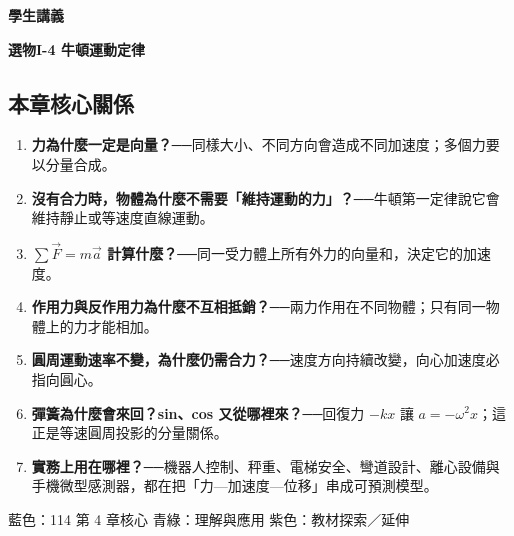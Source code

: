 \documentclass[11pt,a4paper]{article}
\providecommand{\tightlist}{%
  \setlength{\itemsep}{0pt}\setlength{\parskip}{0pt}}
\begin{document}
\begin{tcolorbox}[
  enhanced,colback=white,colframe=HandoutBlue,boxrule=1.1pt,arc=2mm,
  borderline west={3pt}{0pt}{HandoutBlue},left=5mm,right=4mm,top=4mm,bottom=4mm
]
{\sffamily\small\bfseries\color{HandoutBlue}學生講義}\par
{\sffamily\bfseries\LARGE\color{HandoutInk}選物I-4 牛頓運動定律}\par
\vspace{0.35em}{\large 從運動描述連結受力、圓周與振盪}\par
{}\par
{}\par
\end{tcolorbox}


\begin{HandoutLearningMap}

\subsection{本章核心關係}\label{ux672cux7ae0ux6838ux5fc3ux95dcux4fc2}

\begin{enumerate}
\def\labelenumi{\arabic{enumi}.}
\tightlist
\item
  \textbf{力為什麼一定是向量？}──同樣大小、不同方向會造成不同加速度；多個力要以分量合成。
\item
  \textbf{沒有合力時，物體為什麼不需要「維持運動的力」？}──牛頓第一定律說它會維持靜止或等速度直線運動。
\item
  \textbf{\(\sum\vec F=m\vec a\) 計算什麼？}──同一受力體上所有外力的向量和，決定它的加速度。
\item
  \textbf{作用力與反作用力為什麼不互相抵銷？}──兩力作用在不同物體；只有同一物體上的力才能相加。
\item
  \textbf{圓周運動速率不變，為什麼仍需合力？}──速度方向持續改變，向心加速度必指向圓心。
\item
  \textbf{彈簧為什麼會來回？sin、cos 又從哪裡來？}──回復力 \(-kx\) 讓 \(a=-\omega^2x\)；這正是等速圓周投影的分量關係。
\item
  \textbf{實務上用在哪裡？}──機器人控制、秤重、電梯安全、彎道設計、離心設備與手機微型感測器，都在把「力---加速度---位移」串成可預測模型。
\end{enumerate}

{藍色：114 第 4 章核心}
{青綠：理解與應用}
{紫色：教材探索／延伸}

\end{HandoutLearningMap}
\end{document}
